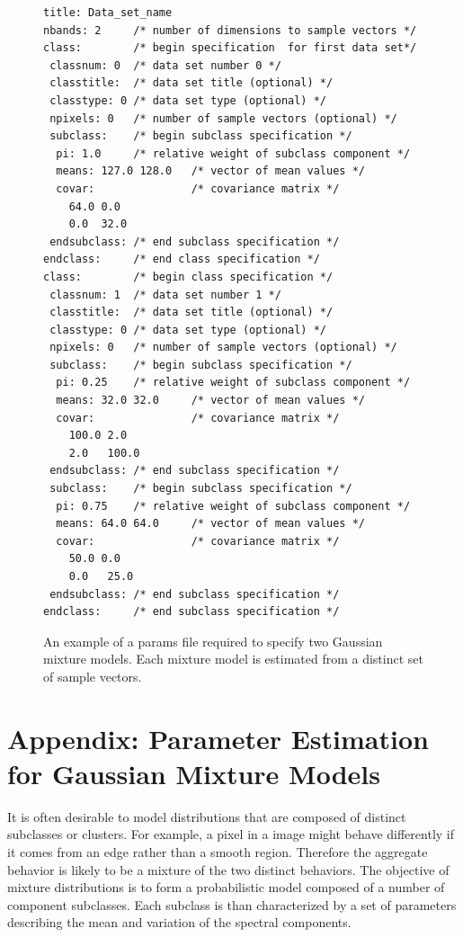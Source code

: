 \documentclass[12pt]{article}
\begin{document}
\begin{figure}
{\small
\begin{center}
\begin{minipage}{5in}
\hrulefill
\begin{verbatim}
title: Data_set_name
nbands: 2     /* number of dimensions to sample vectors */ 
class:        /* begin specification  for first data set*/
 classnum: 0  /* data set number 0 */
 classtitle:  /* data set title (optional) */
 classtype: 0 /* data set type (optional) */
 npixels: 0   /* number of sample vectors (optional) */
 subclass:    /* begin subclass specification */
  pi: 1.0     /* relative weight of subclass component */
  means: 127.0 128.0   /* vector of mean values */
  covar:               /* covariance matrix */
    64.0 0.0
    0.0  32.0
 endsubclass: /* end subclass specification */
endclass:     /* end class specification */
class:        /* begin class specification */
 classnum: 1  /* data set number 1 */
 classtitle:  /* data set title (optional) */
 classtype: 0 /* data set type (optional) */
 npixels: 0   /* number of sample vectors (optional) */
 subclass:    /* begin subclass specification */
  pi: 0.25    /* relative weight of subclass component */
  means: 32.0 32.0     /* vector of mean values */
  covar:               /* covariance matrix */
    100.0 2.0
    2.0   100.0
 endsubclass: /* end subclass specification */
 subclass:    /* begin subclass specification */
  pi: 0.75    /* relative weight of subclass component */
  means: 64.0 64.0     /* vector of mean values */
  covar:               /* covariance matrix */
    50.0 0.0
    0.0   25.0
 endsubclass: /* end subclass specification */
endclass:     /* end subclass specification */
\end{verbatim} 
\hrulefill
\end{minipage}
\end{center}
}
\caption{An example of a params file required
to specify two Gaussian mixture models.
Each mixture model is estimated from a distinct set 
of sample vectors.}
\label{fig:params_file}
\end{figure}


\newpage
\appendix



\section{Appendix: Parameter Estimation for Gaussian Mixture Models} 
\label{sec:parameter_est}

It is often desirable to model distributions
that are composed of distinct subclasses or clusters.
For example, a pixel in a image might behave differently
if it comes from an edge rather than a smooth region.
Therefore the aggregate behavior is likely to be a mixture
of the two distinct behaviors.
The objective of mixture distributions is to form a probabilistic
model composed of a number of component subclasses.
Each subclass is than characterized by a set of parameters
describing the mean and variation of the spectral components.
\end{document}
